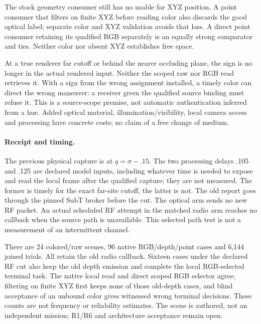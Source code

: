 \documentclass{article}
\begin{document}
The stock geometry consumer still has no usable far XYZ position.
A point consumer that filters on finite XYZ before reading color
also discards the good optical label; separate color and XYZ
validation avoids that loss. A direct point consumer retaining its
qualified RGB separately is an equally strong comparator and ties.
Neither color nor absent XYZ establishes free space.

At a true renderer far cutoff or behind the nearer occluding plane,
the sign is no longer in the actual rendered input. Neither the
scoped raw nor RGB read retrieves it. With a sign from the wrong
assignment installed, a timely color can direct the wrong maneuver:
a receiver given the qualified source binding must refuse it. This
is a source-scope premise, not automatic authentication inferred from
a hue. Added optical material, illumination/visibility, local camera
access and processing have concrete costs; no claim of a free change
of medium.

\paragraph{Receipt and timing.}
The previous physical capture is at $q=\sigma-.15$. The two
processing delays .105 and .125 are declared model inputs, including
whatever time is needed to expose and read the local frame after the
qualified capture; they are not measured. The former is timely for
the exact far-site cutoff, the latter is not. The old report goes
through the pinned SubT broker before the cut. The optical arm sends
no new RF packet. An actual scheduled RF attempt in the matched
radio arm reaches no callback when the source path is unavailable.
This selected path test is not a measurement of an intermittent channel.

There are 24 colored/raw scenes, 96 native RGB/depth/point cases
and 6,144 joined trials. All retain the old radio callback. Sixteen
cases under the declared RF cut also keep the old depth emission and
complete the local RGB-selected terminal task. The native local
read and direct scoped RGB selector agree; filtering on finite XYZ
first keeps none of those old-depth cases, and blind acceptance of an
unbound color gives witnessed wrong terminal decisions. These counts
are not frequency or reliability estimates. The scene is authored, not
an independent mission; R1/R6 and architecture acceptance remain open.
\end{document}
